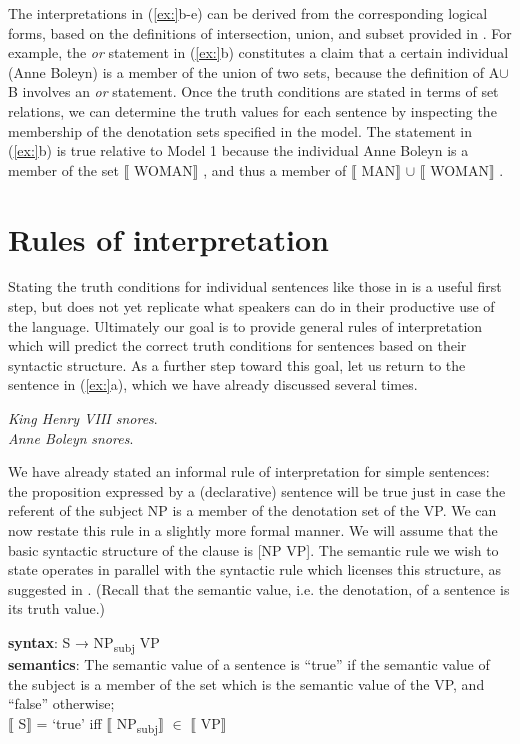 The interpretations in (\ref{ex:}b-e) can be derived from the corresponding logical forms, based on the definitions of intersection, union, and subset provided in . For example, the \textit{or} statement in (\ref{ex:}b) constitutes a claim that a certain individual (Anne Boleyn) is a member of the union of two sets, because the definition of A${\cup}$B involves an \textit{or} statement. Once the truth conditions are stated in terms of set relations, we can determine the truth values for each sentence by inspecting the membership of the denotation sets specified in the model. The statement in (\ref{ex:}b) is true relative to Model 1 because the individual Anne Boleyn is a member of the set $\llbracket$ WOMAN$\rrbracket$ , and thus a member of $\llbracket$ MAN$\rrbracket$  ${\cup}$ $\llbracket$ WOMAN$\rrbracket$ .


\section{Rules of interpretation}\label{sec:} %

Stating the truth conditions for individual sentences like those in  is a useful first step, but does not yet replicate what speakers can do in their productive use of the language. Ultimately our goal is to provide general rules of interpretation which will predict the correct truth conditions for sentences based on their syntactic structure. As a further step toward this goal, let us return to the sentence in (\ref{ex:}a), which we have already discussed several times.


\ea
\ea \textit{King Henry VIII snores}.\\
\ex \textit{Anne Boleyn} \textit{snores}.
                       \z
\z


We have already stated an informal rule of interpretation for simple sentences: the proposition expressed by a (declarative) sentence will be true just in case the referent of the subject NP is a member of the denotation set of the VP. We can now restate this rule in a slightly more formal manner. We will assume that the basic syntactic structure of the clause is [NP VP]. The semantic rule we wish to state operates in parallel with the syntactic rule which licenses this structure, as suggested in . (Recall that the semantic value, i.e. the denotation, of a sentence is its truth value.)


\ea
\textbf{syntax}: S  →  NP\textsubscript{subj}  VP\\
\textbf{semantics}: The semantic value of a sentence is “true” if the semantic value of the subject is a member of the set which is the semantic value of the VP, and “false” otherwise;\\
{}$\llbracket$ S$\rrbracket$  = ‘true’  iff  $\llbracket$ NP\textsubscript{subj}$\rrbracket$  ${\in}$ $\llbracket$ VP$\rrbracket$ 
\z


